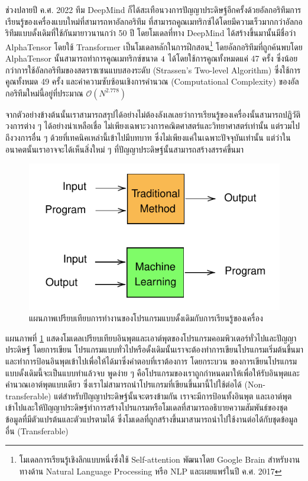 ช่วงปลายปี ค.ศ. 2022 ทีม DeepMind ก็ได้สะเทือนวงการปัญญาประดิษฐ์อีกครั้งด้วยอัลกอริทึมการเรียนรู้ของเครื่องแบบใหม่ที่สามารถหาอัลกอริทึม%
ที่สามารถคูณเมทริกซ์ได้โดยมีความเร็วมากกว่าอัลกอริทึมแบบดั้งเดิมที่ใช้กันมายาวนานกว่า 50 ปี โดยโมเดลที่ทาง DeepMind ได้สร้างขึ้นมานั้นมีชื่อว่า
AlphaTensor โดยใช้ Transformer\autocite{vaswani2017} เป็นโมเดลหลักในการฝึกสอน\footnote{โมเดลการเรียนรู้เชิงลึกแบบหนึ่งซึ่งใช้ 
Self-attention พัฒนาโดย Google Brain สำหรับงานทางด้าน Natural Language Processing หรือ NLP และเผยแพร่ในปี ค.ศ. 2017}
โดยอัลกอริทึมที่ถูกค้นพบโดย AlphaTensor นั้นสามารถทำการคูณเมทริกซ์ขนาด $4 \time 4$ ได้โดยใช้การคูณทั้งหมดแค่ 47 ครั้ง 
ซึ่งน้อยกว่าการใช้อัลกอริทึมของสตราซเซนแบบสองระดับ (Strassen's Two-level Algorithm)\autocite{strassen1969} 
ซึ่งใช้การคูณทั้งหมด 49 ครั้ง และค่าความซับซ้อนเชิงการคำนวณ (Computational Complexity) ของอัลกอริทึมใหม่นี้อยู่ที่ประมาณ 
${\mathcal{O}}({N}^{2.778})$ 

จากตัวอย่างข้างต้นนั้นเราสามารถสรุปได้อย่างไม่ต้องลังเลเลยว่าการเรียนรู้ของเครื่องนั้นสามารถปฏิวัติวงการต่าง ๆ ได้อย่างน่าเหลือเชื่อ
ไม่เพียงเฉพาะวงการคณิตศาสตร์และวิทยาศาสตร์เท่านั้น แต่รวมไปถึงวงการอื่น ๆ ด้วยที่เทคนิคเหล่านี้เข้าไปมีบทบาท ซึ่งไม่เพียงแค่ในเฉพาะปัจจุบันเท่านั้น
แต่ว่าในอนาคตนั้นเราอาจจะได้เห็นสิ่งใหม่ ๆ ที่ปัญญาประดิษฐ์นั้นสามารถสร้างสรรค์ขึ้นมา

\begin{figure}[H]
    \centering
    \includegraphics[scale=1]{fig/ML-concept.pdf}
    \caption{แผนภาพเปรียบเทียบการทำงานของโปรแกรมแบบดั้งเดิมกับการเรียนรู้ของเครื่อง}
    \label{fig:ml_paradigm}
\end{figure}

แผนภาพที่ \ref{fig:ml_paradigm} แสดงโมเดลเปรียบเทียบอินพุตและเอาต์พุตของโปรแกรมคอมพิวเตอร์ทั่วไปและปัญญาประดิษฐ์ โดยการเขียน%
โปรแกรมแบบทั่วไปหรือดั้งเดิมนั้นเราจะต้องทำการเขียนโปรแกรมเริ่มต้นขึ้นมาและทำการป้อนอินพุตเข้าไปเพื่อให้ได้มาซึ่งคำตอบที่เราต้องการ โดยกระบวน%
ของการเขียนโปรแกรมแบบดั้งเดิมนี้จะเป็นแบบทำแล้วจบ พูดง่าย ๆ คือโปรแกรมของเราถูกกำหนดมาให้เพื่อให้รับอินพุตและคำนวณเอาต์พุตแบบเดียว
ซึ่งเราไม่สามารถนำโปรแกรมที่เขียนขึ้นมานี้ไปใช้ต่อได้ (Non-transferable) แต่สำหรับปัญญาประดิษฐ์นั้นจะตรงข้ามกัน เราจะมีการป้อนทั้งอินพุต%
และเอาต์พุตเข้าไปและให้ปัญญาประดิษฐ์ทำการสร้างโปรแกรมหรือโมเดลที่สามารถอธิบายความสัมพันธ์ของชุดข้อมูลที่มีตัวแปรต้นและตัวแปรตามได้ 
ซึ่งโมเดลที่ถูกสร้างขึ้นมาสามารถนำไปใช้งานต่อได้กับชุดข้อมูลอื่น (Transferable)


